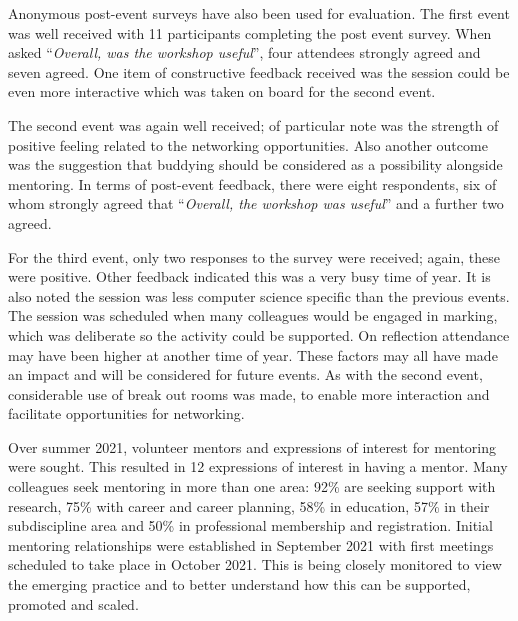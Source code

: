 \documentclass[sigconf]{acmart}
\begin{document}
Anonymous post-event surveys have also been used for evaluation. The
first event was well received with 11 participants completing the post
event survey. When asked ``{\emph{Overall, was the workshop
useful}}'', four attendees strongly agreed and seven agreed. One item
of constructive feedback received was the session could be even more
interactive which was taken on board for the second event.

The second event was again well received; of particular note was the
strength of positive feeling related to the networking
opportunities. Also another outcome was the suggestion that buddying
should be considered as a possibility alongside mentoring. In terms of
post-event feedback, there were eight respondents, six of whom
strongly agreed that ``{\emph{Overall, the workshop was useful}}'' and
a further two agreed.

For the third event, only two responses to the survey were
received; again, these were positive. Other feedback indicated this was a
very busy time of year. It is also noted the session was less computer
science specific than the previous events. The session was scheduled
when many colleagues would be engaged in marking, which was deliberate
so the activity could be supported. On reflection attendance may have
been higher at another time of year. These factors may all have made
an impact and will be considered for future events. As with the second
event, considerable use of break out rooms was made, to enable more
interaction and facilitate opportunities for networking.

\begin{comment}
TO DO - evaluation of Mentoring - PH what is needed here? Is sufficient to indicate the first pilot of 10 Mentees has been established? Or do we need feedback from the participants?
\end{comment}

Over summer 2021, volunteer mentors and expressions of interest for
mentoring were sought. This resulted in 12 expressions of interest in
having a mentor. Many colleagues seek mentoring in more than one area:
92\% are seeking support with research, 75\% with career and career
planning, 58\% in education, 57\% in their subdiscipline area and 50\%
in professional membership and registration. Initial mentoring
relationships were established in September 2021 with first meetings
scheduled to take place in October 2021. This is being closely
monitored to view the emerging practice and to better understand how
this can be supported, promoted and scaled.
\end{document}
